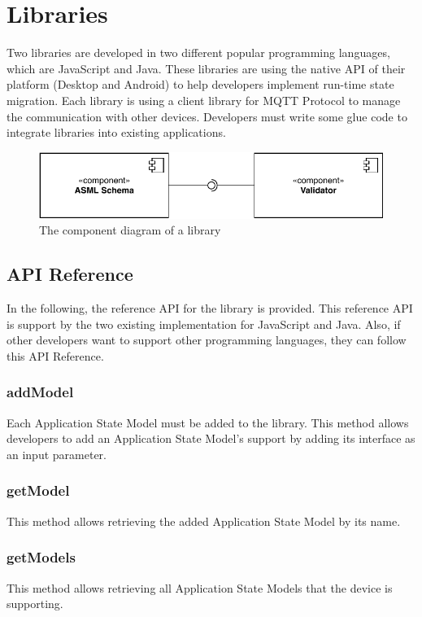\section{Libraries}
Two libraries are developed in two different popular programming languages, which are JavaScript and Java. These libraries are using the native API of their platform (Desktop and Android) to help developers implement run-time state migration. Each library is using a client library for MQTT Protocol to manage the communication with other devices. Developers must write some glue code to integrate libraries into existing applications.

\FloatBarrier
\begin{figure}[H]
    \includegraphics[width=\linewidth]{../figures/libraries-diagram.pdf}
    \centering
    \caption{The component diagram of a library}
    \label{fig:libraries-component}
\end{figure}
\FloatBarrier

\subsection{API Reference}
In the following, the reference API for the library is provided. This reference API is support by the two existing implementation for JavaScript and Java. Also, if other developers want to support other programming languages, they can follow this API Reference. 

\subsubsection{addModel}
Each Application State Model must be added to the library. This method allows developers to add an Application State Model's support by adding its interface as an input parameter.

\subsubsection{getModel}
This method allows retrieving the added Application State Model by its name.

\subsubsection{getModels}
This method allows retrieving all Application State Models that the device is supporting. 

